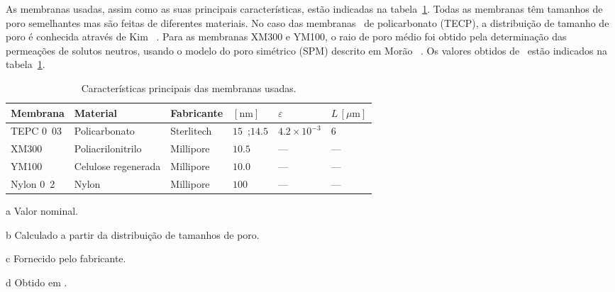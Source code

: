 As membranas usadas, assim como as suas principais características, estão indicadas na tabela~\ref{tab:1art2}. Todas as membranas têm tamanhos de poro semelhantes mas são feitas de diferentes materiais. No caso das membranas \tracketched\ de policarbonato (TECP), a distribuição de tamanho de poro é conhecida através de Kim \et\ \cite{kim97}.
%
%
%
%
Para as membranas XM300 e YM100, o raio de poro médio foi obtido pela determinação das permeações de solutos neutros, usando o modelo do poro simétrico (SPM) descrito em Morão \et\ \cite{moraompa}.
%
Os valores obtidos de \raioporo\ estão indicados na tabela~\ref{tab:1art2}.
\begin{table}%
\centering
\begin{threeparttable}
\caption{Características principais das membranas usadas.}
\label{tab:1art2}
\begin{tabular*}{\textwidth}{@{\phantom{l}}@{\extracolsep{\fill}}llllll}  
\toprule
	Membrana & Material & Fabricante & \raioporo $[\mathrm{nm}]$ & $\varepsilon$ & $L\,[\mu\mathrm{m}]$ \\
\midrule
	TEPC \unit{0.03}{\micro\meter} & Policarbonato \tracketched & Sterlitech & $15$\tnote{a}\ ;$14.5$\tnote{b} & $4.2\times 10^{-3}$\tnote{c} & $6$\tnote{c} \\
	XM300                          & Poliacrilonitrilo          & Millipore  & $10.5$\tnote{d}             & ---                          & ---        \\
	YM100                          & Celulose regenerada        & Millipore  & $10.0$\tnote{e}             & ---                          & ---        \\
	Nylon \unit{0.2}{\micro\meter} & Nylon                      & Millipore  & $100$\tnote{a}              & ---                          & ---        \\
\bottomrule
\end{tabular*}
\begin{tablenotes}
\item[a]Valor nominal.
\item[b]Calculado a partir da distribuição de tamanhos de poro.
\item[c]Fornecido pelo fabricante.
\item[d]Obtido em \cite{meu1}.
\end{tablenotes}
\end{threeparttable}
\end{table}

